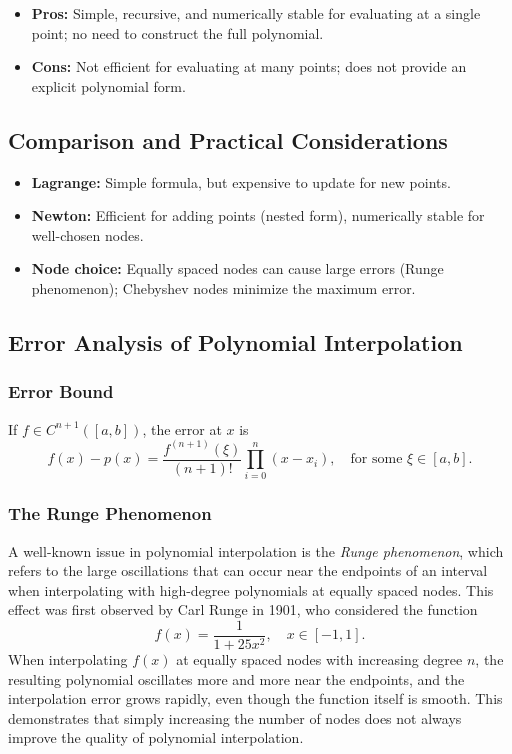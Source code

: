 \begin{itemize}[nosep]
    \item \textbf{Pros:} Simple, recursive, and numerically stable for evaluating at a single point; no need to construct the full polynomial.
    \item \textbf{Cons:} Not efficient for evaluating at many points; does not provide an explicit polynomial form.
\end{itemize}

\subsection{Comparison and Practical Considerations}
\begin{itemize}[nosep]
    \item \textbf{Lagrange:} Simple formula, but expensive to update for new points.
    \item \textbf{Newton:} Efficient for adding points (nested form), numerically stable for well-chosen nodes.
    \item \textbf{Node choice:} Equally spaced nodes can cause large errors (Runge phenomenon); Chebyshev nodes minimize the maximum error.
\end{itemize}

\subsection{Error Analysis of Polynomial Interpolation}
\subsubsection{Error Bound}
If \(f \in C^{n+1}([a,b])\), the error at \(x\) is
\[
    f(x) - p(x) = \frac{f^{(n+1)}(\xi)}{(n+1)!} \prod_{i=0}^n (x - x_i), \quad \text{for some } \xi \in [a,b].
\]

\subsubsection{The Runge Phenomenon}
A well-known issue in polynomial interpolation is the \emph{Runge phenomenon}, which refers to the large oscillations that can occur near the endpoints of an interval when interpolating with high-degree polynomials at equally spaced nodes. This effect was first observed by Carl Runge in 1901, who considered the function
\[
    f(x) = \frac{1}{1 + 25x^2}, \quad x \in [-1, 1].
\]
When interpolating \(f(x)\) at equally spaced nodes with increasing degree \(n\), the resulting polynomial oscillates more and more near the endpoints, and the interpolation error grows rapidly, even though the function itself is smooth. This demonstrates that simply increasing the number of nodes does not always improve the quality of polynomial interpolation.

